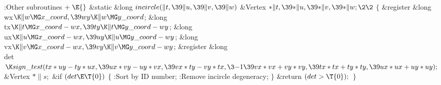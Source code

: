 \Y\B\4:Other subroutines\X${}\mathrel+\E{}$\6
\1\1\&{static} \&{long} ${}\\{incircle}(\|t,\39\|u,\39\|v,\39\|w){}$\6
\&{Vertex} ${}{*}\|t,\39{*}\|u,\39{*}\|v,\39{*}\|w;\2\2{}$\6
${}\{{}$\5
\1\&{register} \&{long} \\{wx}${}\K\|w\MG\\{x\_coord},\39\\{wy}\K\|w\MG\\{y%
\_coord}{}$;\6
\&{long} \\{tx}${}\K\|t\MG\\{x\_coord}-\\{wx},\39\\{ty}\K\|t\MG\\{y\_coord}-%
\\{wy}{}$;\6
\&{long} \\{ux}${}\K\|u\MG\\{x\_coord}-\\{wx},\39\\{uy}\K\|u\MG\\{y\_coord}-%
\\{wy}{}$;\6
\&{long} \\{vx}${}\K\|v\MG\\{x\_coord}-\\{wx},\39\\{vy}\K\|v\MG\\{y\_coord}-%
\\{wy}{}$;\6
\&{register} \&{long} \\{det}${}\K\\{sign\_test}(\\{tx}*\\{uy}-\\{ty}*\\{ux},%
\39\\{ux}*\\{vy}-\\{uy}*\\{vx},\39\\{vx}*\\{ty}-\\{vy}*\\{tx},\3{-1}\39\\{vx}*%
\\{vx}+\\{vy}*\\{vy},\39\\{tx}*\\{tx}+\\{ty}*\\{ty},\39\\{ux}*\\{ux}+\\{uy}*%
\\{uy});{}$\6
\&{Vertex} ${}{*}\|s;{}$\7
\&{if} ${}(\\{det}\E\T{0}){}$\5
${}\{{}$\1\6
:Sort  by ID number\X;\6
:Remove incircle degeneracy\X;\6
\4${}\}{}$\2\6
\&{return} ${}(\\{det}>\T{0});{}$\6
\4${}\}{}$\2\par
\fi

